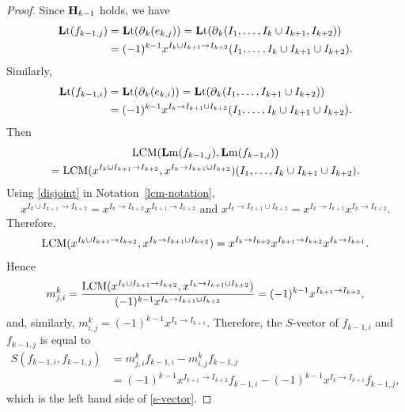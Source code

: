 \documentclass[ALCO]{cedram}
\newcommand{\lm}{\mbox{${\bf L}{\rm m}$}}
\newcommand{\lt}{\mbox{${\bf L}{\rm t}$}}
\newcommand{\mbfh}{\mbox{${\bf H}$}}
\newcommand{\dif}{\mbox{$\partial$}}
\newcommand{\Lcm}{\mbox{${\rm LCM}$}}
\begin{document}
\begin{proof}
Since $\mbfh_{k-1}$ holds, we have
\begin{align*}
\lt(f_{k-1,j})&=\lt(\dif_{k}(e_{k,j}))=\lt(\dif_{k}(I_1,\ldots,I_{k}\cup
I_{k+1},I_{k+2}))\\
&= (-1)^{k-1}x^{I_{k}\cup I_{k+1}\to I_{k+2}}(I_1,\ldots
,I_{k}\cup I_{k+1}\cup I_{k+2}).
\end{align*}
Similarly,
\begin{align*}
\lt(f_{k-1,i})&=\lt(\dif_{k}(e_{k,i}))=\lt(\dif_{k}(I_1,\ldots,
I_{k+1}\cup I_{k+2}))\\
&= (-1)^{k-1}x^{I_{k}\to I_{k+1}\cup I_{k+2}}(I_1,\ldots
,I_{k}\cup I_{k+1}\cup I_{k+2}).
\end{align*}
Then 
\begin{multline*}
\Lcm(\lm(f_{k-1,j}),\lm(f_{k-1,i}))\\
= \Lcm(x^{I_{k}\cup I_{k+1}\to
  I_{k+2}},x^{I_{k}\to I_{k+1}\cup I_{k+2}})(I_1,\ldots ,I_{k}\cup
I_{k+1}\cup I_{k+2}).
\end{multline*}
Using \eqref{disjoint} in Notation~\ref{lcm-notation},
\begin{eqnarray*}
x^{I_{k}\cup I_{k+1}\to I_{k+2}}=x^{I_{k}\to I_{k+2}}x^{I_{k+1}\to
  I_{k+2}}\mbox{ and } x^{I_{k}\to I_{k+1}\cup I_{k+2}}=x^{I_{k}\to
  I_{k+1}}x^{I_{k}\to I_{k+2}}.
\end{eqnarray*}
Therefore,
\begin{eqnarray*}
\Lcm(x^{I_{k}\cup I_{k+1}\to I_{k+2}},x^{I_{k}\to I_{k+1}\cup
  I_{k+2}})=x^{I_{k}\to I_{k+2}}x^{I_{k+1}\to I_{k+2}}x^{I_{k}\to I_{k+1}}.
\end{eqnarray*}
Hence
\begin{eqnarray*}
m^{k}_{j,i}= \frac{\Lcm(x^{I_{k}\cup I_{k+1}\to
    I_{k+2}},x^{I_{k}\to I_{k+1}\cup
    I_{k+2}})}{(-1)^{k-1}x^{I_{k}\to I_{k+1}\cup
    I_{k+2}}}=(-1)^{k-1}x^{I_{k+1}\to I_{k+2}},
\end{eqnarray*}
and, similarly, $m^{k}_{i,j}=(-1)^{k-1}x^{I_{k}\to
  I_{k+1}}$. Therefore, the $S$-vector of $f_{k-1,i}$ and $f_{k-1,j}$ is
equal to
\begin{align*}
 S(f_{k-1,i},f_{k-1,j})&=m^{k}_{j,i}f_{k-1,i}-m^{k}_{i,j}f_{k-1,j}\\
&= (-1)^{k-1}x^{I_{k+1}\to
  I_{k+2}}f_{k-1,i}-(-1)^{k-1}x^{I_{k}\to I_{k+1}}f_{k-1,j},
\end{align*}
which is the left hand side of \eqref{s-vector}.


\end{proof}
\end{document}
